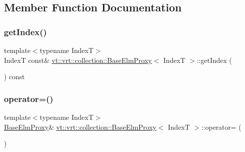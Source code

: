 \subsection{Member Function Documentation}
\mbox{\label{structvt_1_1vrt_1_1collection_1_1_base_elm_proxy_a511db5c925e46aa42c18be66d8388d6f}} 
\subsubsection{\texorpdfstring{get\+Index()}{getIndex()}}
{\footnotesize\ttfamily template$<$typename IndexT$>$ \\
IndexT const\& \hyperlink{structvt_1_1vrt_1_1collection_1_1_base_elm_proxy}{vt\+::vrt\+::collection\+::\+Base\+Elm\+Proxy}$<$ IndexT $>$\+::get\+Index (\begin{DoxyParamCaption}{ }\end{DoxyParamCaption}) const\hspace{0.3cm}{\ttfamily [inline]}}

\mbox{\label{structvt_1_1vrt_1_1collection_1_1_base_elm_proxy_a9e27c5d3fc8f4470bd28dbb4ad9113bb}} 
\subsubsection{\texorpdfstring{operator=()}{operator=()}}
{\footnotesize\ttfamily template$<$typename IndexT$>$ \\
\hyperlink{structvt_1_1vrt_1_1collection_1_1_base_elm_proxy}{Base\+Elm\+Proxy}\& \hyperlink{structvt_1_1vrt_1_1collection_1_1_base_elm_proxy}{vt\+::vrt\+::collection\+::\+Base\+Elm\+Proxy}$<$ IndexT $>$\+::operator= (\begin{DoxyParamCaption}\item[{\hyperlink{structvt_1_1vrt_1_1collection_1_1_base_elm_proxy}{Base\+Elm\+Proxy}$<$ IndexT $>$ const \&}]{ }\end{DoxyParamCaption})\hspace{0.3cm}{\ttfamily [default]}}

